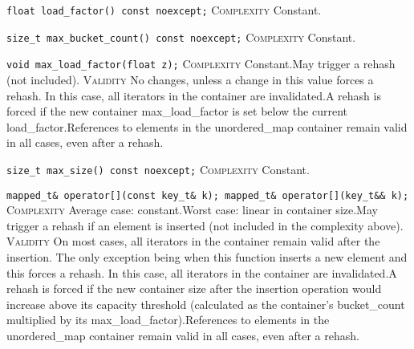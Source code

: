 \noindent{}\hspace*{0.25em}\lstinline[basicstyle=\ttfamily\color{cgreen}]{float load_factor() const noexcept;} \textsc{Complexity} Constant.\\\vspace{-0.6em}

\noindent{}\hspace*{0.25em}\lstinline[basicstyle=\ttfamily\color{cgreen}]{size_t max_bucket_count() const noexcept;} \textsc{Complexity} Constant.\\\vspace{-0.6em}

\noindent{}\hspace*{0.25em}\lstinline[basicstyle=\ttfamily\color{cgreen}]{void max_load_factor(float z);} \textsc{Complexity} Constant.May trigger a rehash (not included). \textsc{Validity} No changes, unless a change in this value forces a rehash. In this case, all iterators in the container are invalidated.A rehash is forced if the new container max\_load\_factor is set below the current load\_factor.References to elements in the unordered\_map container remain valid in all cases, even after a rehash.\\\vspace{-0.6em}

\noindent{}\hspace*{0.25em}\lstinline[basicstyle=\ttfamily\color{cgreen}]{size_t max_size() const noexcept;} \textsc{Complexity} Constant.\\\vspace{-0.6em}

\noindent{}\hspace*{0.25em}\lstinline[basicstyle=\ttfamily\color{corange}]{mapped_t& operator[](const key_t& k); mapped_t& operator[](key_t&& k);} \textsc{Complexity} Average case: constant.Worst case: linear in container size.May trigger a rehash if an element is inserted (not included in the complexity above). \textsc{Validity} On most cases, all iterators in the container remain valid after the insertion. The only exception being when this function inserts a new element and this forces a rehash. In this case, all iterators in the container are invalidated.A rehash is forced if the new container size after the insertion operation would increase above its capacity threshold (calculated as the container's bucket\_count multiplied by its max\_load\_factor).References to elements in the unordered\_map container remain valid in all cases, even after a rehash.\\\vspace{-0.6em}


